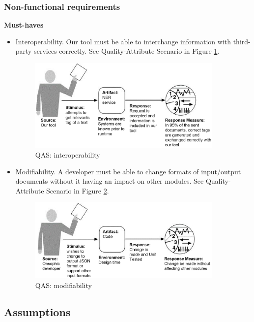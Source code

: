 \documentclass[a4paper,12pt]{article}
\begin{document}
\subsubsection{Non-functional requirements}
\textbf{Must-haves}
\begin{itemize}
    \item Interoperability. Our tool must be able to interchange information with third-party services correctly. See Quality-Attribute Scenario in Figure \ref{fig:qas-interoperability}.
    
\begin{figure}[H]
  \centering
      \includegraphics[width=0.9\textwidth]{figures/QAS-interoperability}
  \caption{QAS: interoperability}
\label{fig:qas-interoperability}
\end{figure}

    \item Modifiability. A developer must be able to change formats of input/output documents without it having an impact on other modules. See Quality-Attribute Scenario in Figure \ref{fig:qas-modifiability}.
    
\begin{figure}[H]
  \centering
      \includegraphics[width=0.9\textwidth]{figures/QAS-modifiability}
  \caption{QAS: modifiability}
\label{fig:qas-modifiability}
\end{figure}
    
\end{itemize}
\subsection{Assumptions}
\end{document}
